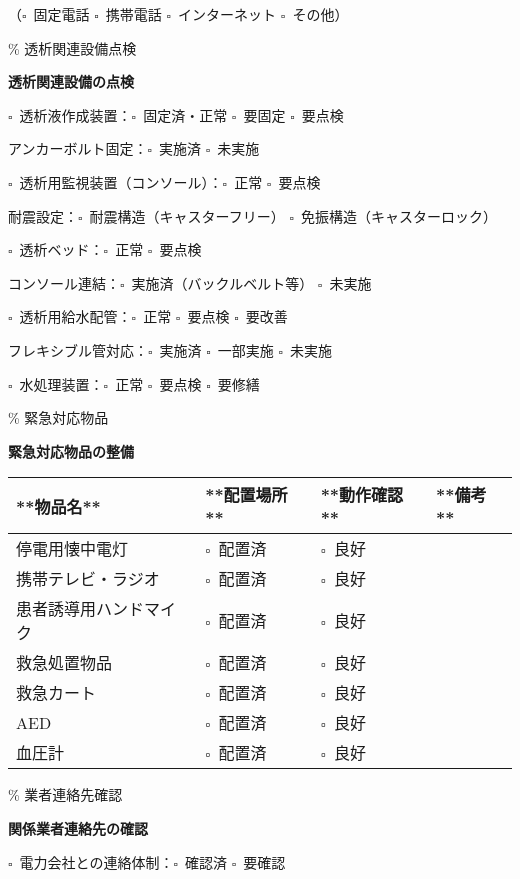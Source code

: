 \documentclass[
  japanese,
]{jarticle}
\newcommand{\checkbox}{$\square$\ }
\begin{document}
（\checkbox 固定電話 \checkbox 携帯電話 \checkbox インターネット
\checkbox その他）

\% 透析関連設備点検

\textbf{\large 透析関連設備の点検}

\checkbox 透析液作成装置：\checkbox 固定済・正常 \checkbox 要固定
\checkbox 要点検

アンカーボルト固定：\checkbox 実施済 \checkbox 未実施

\checkbox 透析用監視装置（コンソール）：\checkbox 正常 \checkbox 要点検

耐震設定：\checkbox 耐震構造（キャスターフリー）
\checkbox 免振構造（キャスターロック）

\checkbox 透析ベッド：\checkbox 正常 \checkbox 要点検

コンソール連結：\checkbox 実施済（バックルベルト等） \checkbox 未実施

\checkbox 透析用給水配管：\checkbox 正常 \checkbox 要点検
\checkbox 要改善

フレキシブル管対応：\checkbox 実施済 \checkbox 一部実施 \checkbox 未実施

\checkbox 水処理装置：\checkbox 正常 \checkbox 要点検 \checkbox 要修繕

\% 緊急対応物品

\textbf{\large 緊急対応物品の整備}

\begin{longtable*}{|p{4cm}|p{2cm}|p{2cm}|p{3cm}|}
\hline
**物品名** & **配置場所** & **動作確認** & **備考** \\
\hline
停電用懐中電灯 & \checkbox 配置済 & \checkbox 良好 & \\[0.5cm]
\hline
携帯テレビ・ラジオ & \checkbox 配置済 & \checkbox 良好 & \\[0.5cm]
\hline
患者誘導用ハンドマイク & \checkbox 配置済 & \checkbox 良好 & \\[0.5cm]
\hline
救急処置物品 & \checkbox 配置済 & \checkbox 良好 & \\[0.5cm]
\hline
救急カート & \checkbox 配置済 & \checkbox 良好 & \\[0.5cm]
\hline
AED & \checkbox 配置済 & \checkbox 良好 & \\[0.5cm]
\hline
血圧計 & \checkbox 配置済 & \checkbox 良好 & \\[0.5cm]
\hline
\end{longtable*}

\% 業者連絡先確認

\textbf{\large 関係業者連絡先の確認}

\checkbox 電力会社との連絡体制：\checkbox 確認済 \checkbox 要確認
\end{document}
